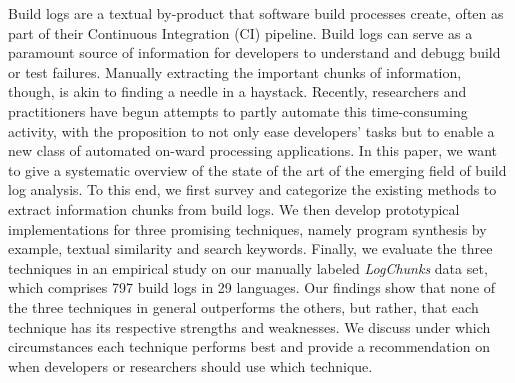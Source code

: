 Build logs are a textual by-product that software build processes
create, often as part of their Continuous Integration (CI)
pipeline. Build logs can serve as a paramount source of
information for developers to understand and debugg build or
test failures. Manually
extracting the important chunks of information, though, is akin to
finding a needle in a haystack. Recently, researchers and practitioners have begun attempts to partly automate
this time-consuming activity, with the proposition to not only ease developers' tasks but to enable a new class of automated on-ward processing applications.
In this paper, we want to give a systematic overview of the state of the art of the emerging field of build log analysis. To this end, we first survey and categorize the existing methods to extract information chunks from build logs. We then develop prototypical implementations for three promising techniques, namely program synthesis
by example, textual similarity and search keywords. Finally, we evaluate the three techniques in an empirical study on our manually
labeled \emph{LogChunks} data set, which comprises 797 build logs in 29 languages.
Our findings show that none of the three techniques in general outperforms
the others, but rather, that each technique has its respective strengths and weaknesses. We discuss under which circumstances each technique performs best
and provide a recommendation on when developers or researchers should use which
technique.
